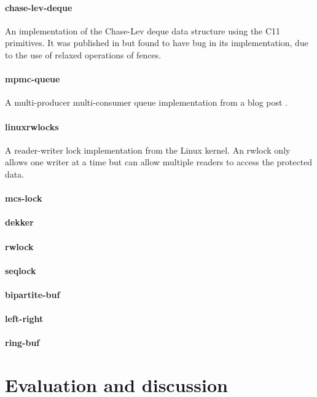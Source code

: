 \paragraph{chase-lev-deque} An implementation of the Chase-Lev deque data structure using the C11 primitives. It was published in \cite{chase-lev-deque-impl} but found to have bug in its implementation, due to the use of relaxed operations of fences. 

\paragraph{mpmc-queue} A multi-producer multi-consumer queue implementation from a blog post \cite{mpmc-queue-impl}. 

\paragraph{linuxrwlocks} A reader-writer lock implementation from the Linux kernel. An rwlock only allows one writer at a time but can allow multiple readers to access the protected data. 


\paragraph{mcs-lock}
\paragraph{dekker}
\paragraph{rwlock}
\paragraph{seqlock}
\paragraph{bipartite-buf}
\paragraph{left-right}
\paragraph{ring-buf}



\section{Evaluation and discussion}


